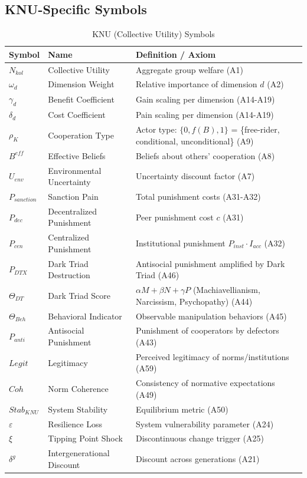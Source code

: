 \subsection{KNU-Specific Symbols}

\begin{longtable}{@{}lp{4cm}p{7cm}@{}}
\caption{KNU (Collective Utility) Symbols} \\
\toprule
\textbf{Symbol} & \textbf{Name} & \textbf{Definition / Axiom} \\
\midrule
\endfirsthead
\midrule
\endhead
\bottomrule
\endlastfoot

$N_{kol}$ & Collective Utility & Aggregate group welfare (A1) \\
$\omega_d$ & Dimension Weight & Relative importance of dimension $d$ (A2) \\
$\gamma_d$ & Benefit Coefficient & Gain scaling per dimension (A14-A19) \\
$\delta_d$ & Cost Coefficient & Pain scaling per dimension (A14-A19) \\
\addlinespace
$\rho_K$ & Cooperation Type & Actor type: $\{0, f(B), 1\}$ = \{free-rider, conditional, unconditional\} (A9) \\
$B^{eff}$ & Effective Beliefs & Beliefs about others' cooperation (A8) \\
$U_{env}$ & Environmental Uncertainty & Uncertainty discount factor (A7) \\
\addlinespace
$P_{sanction}$ & Sanction Pain & Total punishment costs (A31-A32) \\
$P_{dec}$ & Decentralized Punishment & Peer punishment cost $c$ (A31) \\
$P_{cen}$ & Centralized Punishment & Institutional punishment $P_{inst} \cdot I_{acc}$ (A32) \\
$P_{DTX}$ & Dark Triad Destruction & Antisocial punishment amplified by Dark Triad (A46) \\
\addlinespace
$\Theta_{DT}$ & Dark Triad Score & $\alpha M + \beta N + \gamma P$ (Machiavellianism, Narcissism, Psychopathy) (A44) \\
$\Theta_{Beh}$ & Behavioral Indicator & Observable manipulation behaviors (A45) \\
$P_{anti}$ & Antisocial Punishment & Punishment of cooperators by defectors (A43) \\
\addlinespace
$Legit$ & Legitimacy & Perceived legitimacy of norms/institutions (A59) \\
$Coh$ & Norm Coherence & Consistency of normative expectations (A49) \\
$Stab_{KNU}$ & System Stability & Equilibrium metric (A50) \\
\addlinespace
$\varepsilon$ & Resilience Loss & System vulnerability parameter (A24) \\
$\xi$ & Tipping Point Shock & Discontinuous change trigger (A25) \\
$\delta^g$ & Intergenerational Discount & Discount across generations (A21) \\

\end{longtable}


